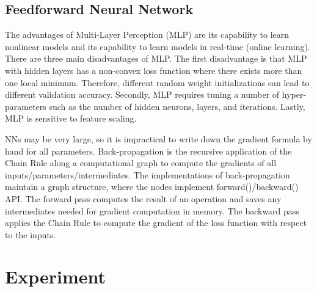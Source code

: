 \documentclass[conference]{IEEEtran}
\begin{document}
\subsection{Feedforward Neural Network}


The advantages of Multi-Layer Perception (MLP) are its capability to learn nonlinear models and its capability to learn models in real-time (online learning). %
There are three main disadvantages of MLP. The first disadvantage is that MLP with hidden layers has a non-convex loss function where there exists more than one local minimum. Therefore, different random weight initializations can lead to different validation accuracy. Secondly, MLP requires tuning a number of hyper-parameters such as the number of hidden neurons, layers, and iterations. Lastly, MLP is sensitive to feature scaling. 

NNs may be very large, so it is impractical to write down the gradient formula by hand for all parameters. Back-propagation is the recursive application of the Chain Rule along a computational graph to compute the gradients of all inputs/parameters/intermediates. The implementations of back-propagation maintain a graph structure, where the nodes implement forward()/backward() API. The forward pass computes the result of an operation and saves any intermediates needed for gradient computation in memory. The backward pass applies the Chain Rule to compute the gradient of the loss function with respect to the inputs. %

\section{Experiment}
\end{document}
